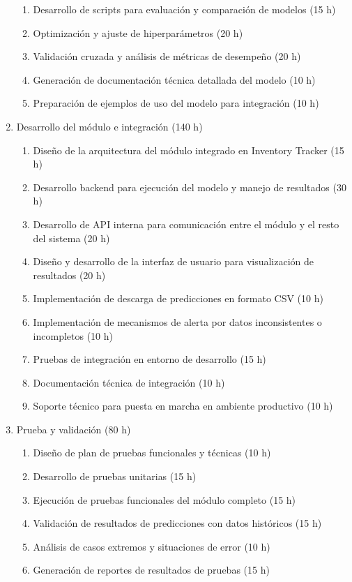 \documentclass[
11pt, %
]{charter}
\begin{document}
\begin{enumerate}
\begin{enumerate}
\item Desarrollo de scripts para evaluación y comparación de modelos (15 h)
\item Optimización y ajuste de hiperparámetros (20 h)
\item Validación cruzada y análisis de métricas de desempeño (20 h)
\item Generación de documentación técnica detallada del modelo (10 h)
\item Preparación de ejemplos de uso del modelo para integración (10 h)
\end{enumerate}
\item Desarrollo del módulo e integración (140 h)
\begin{enumerate}
\item Diseño de la arquitectura del módulo integrado en Inventory Tracker (15 h)
\item Desarrollo backend para ejecución del modelo y manejo de resultados (30 h)
\item Desarrollo de API interna para comunicación entre el módulo y el resto del sistema (20 h)
\item Diseño y desarrollo de la interfaz de usuario para visualización de resultados (20 h)
\item Implementación de descarga de predicciones en formato CSV (10 h)
\item Implementación de mecanismos de alerta por datos inconsistentes o incompletos (10 h)
\item Pruebas de integración en entorno de desarrollo (15 h)
\item Documentación técnica de integración (10 h)
\item Soporte técnico para puesta en marcha en ambiente productivo (10 h)
\end{enumerate}
\item Prueba y validación (80 h)
\begin{enumerate}
\item Diseño de plan de pruebas funcionales y técnicas (10 h)
\item Desarrollo de pruebas unitarias (15 h)
\item Ejecución de pruebas funcionales del módulo completo (15 h)
\item Validación de resultados de predicciones con datos históricos (15 h)
\item Análisis de casos extremos y situaciones de error (10 h)
\item Generación de reportes de resultados de pruebas (15 h)

\end{enumerate}
\end{enumerate}
\end{document}
